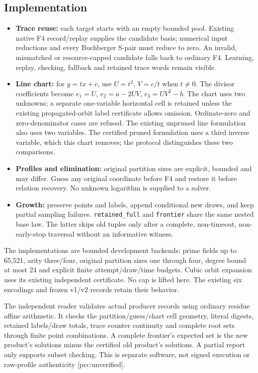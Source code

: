 \documentclass[
  10pt,
]{article}
\providecommand{\tightlist}{%
  \setlength{\itemsep}{0pt}\setlength{\parskip}{0pt}}
\begin{document}
\subsection{Implementation}\label{implementation}

\begin{itemize}
\tightlist
\item
  \textbf{Trace reuse:} each target starts with an empty bounded pool.
  Existing native F4 record/replay supplies the candidate basis;
  numerical input reductions and every Buchberger S-pair must reduce to
  zero. An invalid, mismatched or resource-capped candidate falls back
  to ordinary F4. Learning, replay, checking, fallback and retained
  trace words remain visible.
\item
  \textbf{Line chart:} for \(y=tx+c\), use \(U=t^2\), \(V=c/t\) when
  \(t\ne0\). The divisor coefficients become \(e_1=U\), \(e_2=a-2UV\),
  \(e_3=UV^2-b\). The chart uses two unknowns; a separate one-variable
  horizontal cell is retained unless the existing propagated-orbit label
  certificate allows omission. Ordinate-zero and zero-denominator cases
  are refused. The existing unpruned line formulation also uses two
  variables. The certified pruned formulation uses a third inverse
  variable, which this chart removes; the protocol distinguishes these
  two comparisons.
\item
  \textbf{Profiles and elimination:} original partition sizes are
  explicit, bounded and may differ. Guess any original coordinate before
  F4 and restore it before relation recovery. No unknown logarithm is
  supplied to a solver.
\item
  \textbf{Growth:} preserve points and labels, append conditional new
  draws, and keep partial sampling failures. \texttt{retained\_full} and
  \texttt{frontier} share the same nested base law. The latter skips old
  tuples only after a complete, non-timeout, non-early-stop traversal
  without an informative witness.
\end{itemize}

The implementations are bounded development backends: prime fields up to
65,521, arity three/four, original partition sizes one through four,
degree bound at most 24 and explicit finite attempt/draw/time budgets.
Cubic orbit expansion uses its existing independent certificate. No cap
is lifted here. The existing six encodings and frozen v1/v2 records
retain their behavior.

The independent reader validates actual producer records using ordinary
residue affine arithmetic. It checks the partition/guess/chart cell
geometry, literal digests, retained labels/draw totals, trace counter
continuity and complete root sets through finite point combinations. A
complete frontier's expected set is the new product's solutions minus
the certified old product's solutions. A partial report only supports
subset checking. This is separate software, not signed execution or
raw-profile authenticity {[}pcc:unverified{]}.
\end{document}
